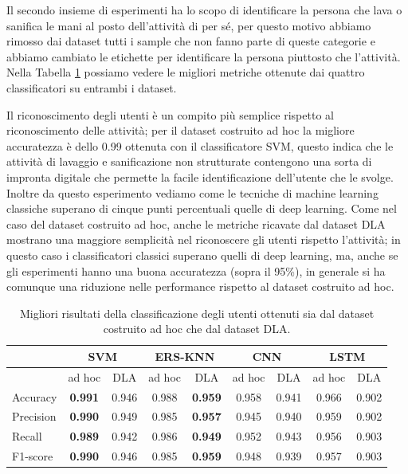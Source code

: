 Il secondo insieme di esperimenti ha lo scopo di identificare la persona che lava o sanifica le mani al posto dell'attività di per sé, per questo motivo abbiamo rimosso dai dataset tutti i sample che non fanno parte di queste categorie e abbiamo cambiato le etichette per identificare la persona piuttosto che l'attività. Nella Tabella \ref{tab:person-classification} possiamo vedere le migliori metriche ottenute dai quattro classificatori su entrambi i dataset. 

Il riconoscimento degli utenti è un compito più semplice rispetto al riconoscimento delle attività; per il dataset costruito ad hoc la migliore accuratezza è dello 0.99 ottenuta con il classificatore SVM, questo indica che le attività di lavaggio e sanificazione non strutturate contengono una sorta di impronta digitale che permette la facile identificazione dell'utente che le svolge. Inoltre da questo esperimento vediamo come le tecniche di machine learning classiche superano di cinque punti percentuali quelle di deep learning. Come nel caso del dataset costruito ad hoc, anche le metriche ricavate dal dataset DLA mostrano una maggiore semplicità nel riconoscere gli utenti rispetto l'attività; in questo caso i classificatori classici superano quelli di deep learning, ma, anche se gli esperimenti hanno una buona accuratezza (sopra il 95\%), in generale si ha comunque una riduzione nelle performance rispetto al dataset costruito ad hoc.

\begin{table}
    \centering
    \begin{tabular}{l | c c | c c | c c | c c}
        \hline
        & \multicolumn{2}{c}{SVM} & \multicolumn{2}{c}{ERS-KNN} & \multicolumn{2}{c}{CNN} & \multicolumn{2}{c}{LSTM} \\
        \hline
        & ad hoc & DLA & ad hoc & DLA & ad hoc & DLA & ad hoc & DLA \\
        \hline
        Accuracy  & \textbf{0.991} & 0.946 & 0.988 & \textbf{0.959} & 0.958 & 0.941 & 0.966 & 0.902 \\
        Precision & \textbf{0.990} & 0.949 & 0.985 & \textbf{0.957} & 0.945 & 0.940 & 0.959 & 0.902 \\
        Recall    & \textbf{0.989} & 0.942 & 0.986 & \textbf{0.949} & 0.952 & 0.943 & 0.956 & 0.903 \\
        F1-score  & \textbf{0.990} & 0.946 & 0.985 & \textbf{0.959} & 0.948 & 0.939 & 0.957 & 0.903 \\
        \hline
    \end{tabular}
    \caption{Migliori risultati della classificazione degli utenti ottenuti sia dal dataset costruito ad hoc che dal dataset DLA.}
    \label{tab:person-classification}
\end{table}

